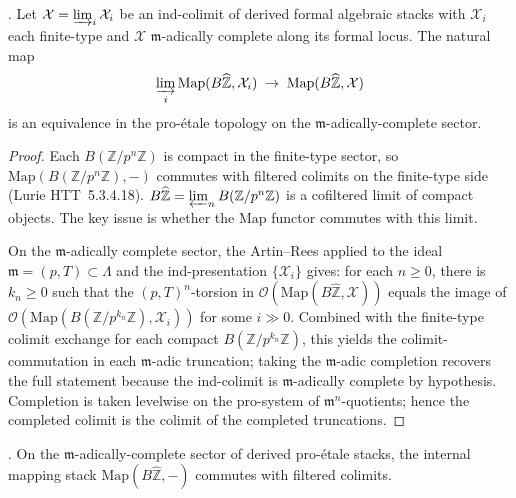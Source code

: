 \begin{proposition}
\label{v4-arith:w5-i:prop:b2-closure}
\ClaimStatusProvedHere. Let \(\mathcal{X}=\varinjlim_{i}\mathcal{X}_{i}\)
be an ind-colimit of derived formal algebraic stacks with
\(\mathcal{X}_{i}\) each finite-type and \(\mathcal{X}\)
\(\mathfrak{m}\)-adically complete along its formal locus. The natural
map
\[
\varinjlim_{i}\mathrm{Map}(B\widehat{\mathbb{Z}},\mathcal{X}_{i})\;\to\;\mathrm{Map}(B\widehat{\mathbb{Z}},\mathcal{X})
\]
is an equivalence in the pro-\'etale topology on the
\(\mathfrak{m}\)-adically-complete sector.
\end{proposition}

\begin{proof}
Each \(B(\mathbb{Z}/p^{n}\mathbb{Z})\) is compact in the finite-type
sector, so \(\mathrm{Map}(B(\mathbb{Z}/p^{n}\mathbb{Z}),-)\) commutes
with filtered colimits on the finite-type side (Lurie HTT~5.3.4.18).
\(B\widehat{\mathbb{Z}}=\varprojlim_{n}B(\mathbb{Z}/p^{n}\mathbb{Z})\)
is a cofiltered limit of compact objects. The key issue is whether
the \(\mathrm{Map}\) functor commutes with this limit.

On the \(\mathfrak{m}\)-adically complete sector, the Artin--Rees
 applied to the ideal
\(\mathfrak{m}=(p,T)\subset\Lambda\) and the ind-presentation
\(\{\mathcal{X}_{i}\}\) gives: for each \(n\geq 0\), there is
\(k_{n}\geq 0\) such that the \((p,T)^{n}\)-torsion in
\(\mathcal{O}(\mathrm{Map}(B\widehat{\mathbb{Z}},\mathcal{X}))\)
equals the image of
\(\mathcal{O}(\mathrm{Map}(B(\mathbb{Z}/p^{k_{n}}\mathbb{Z}),\mathcal{X}_{i}))\)
for some \(i\gg 0\). Combined with the finite-type colimit exchange
for each compact \(B(\mathbb{Z}/p^{k_{n}}\mathbb{Z})\), this yields
the colimit-commutation in each \(\mathfrak{m}\)-adic truncation;
	taking the \(\mathfrak{m}\)-adic completion recovers the full
statement because the ind-colimit is
\(\mathfrak{m}\)-adically complete by hypothesis.
Completion is taken levelwise on the pro-system of
\(\mathfrak m^n\)-quotients; hence the completed colimit is the colimit
of the completed truncations.
\end{proof}

\begin{corollary}
\label{v4-arith:w5-i:cor:b1-closure}
\ClaimStatusProvedHere. On the \(\mathfrak{m}\)-adically-complete
sector of derived pro-\'etale stacks, the internal mapping stack
\(\mathrm{Map}(B\widehat{\mathbb{Z}},-)\) commutes with filtered
colimits.
\end{corollary}

